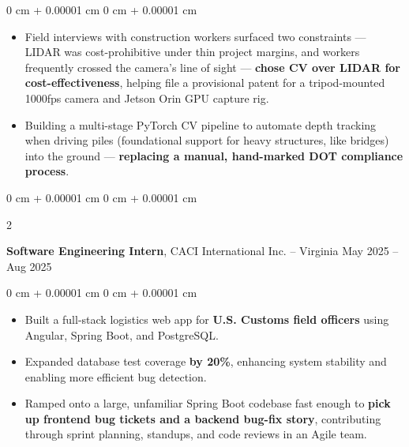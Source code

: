 \documentclass[10pt, letterpaper]{article}
\newenvironment{highlights}{
    \begin{itemize}[
        topsep=0.3 cm,
        parsep=0.075 cm,
        partopsep=0pt,
        itemsep=0.035 cm,
        leftmargin=0 cm + 10pt
    ]
}{
    \end{itemize}
} %
\newenvironment{onecolentry}{
    \begin{adjustwidth}{
        0 cm + 0.00001 cm
    }{
        0 cm + 0.00001 cm
    }
}{
    \end{adjustwidth}
} %
\newenvironment{twocolentry}[2][]{
    \onecolentry
    \def\secondColumn{#2}
    \setcolumnwidth{\fill, 4.5 cm}
    \begin{paracol}{2}
}{
    \switchcolumn \raggedleft \secondColumn
    \end{paracol}
    \endonecolentry
} %
\begin{document}
        \vspace{0.19 cm}
        \begin{onecolentry}
            \begin{highlights}
                \item Field interviews with construction workers surfaced two constraints — LIDAR was cost-prohibitive under thin project margins, and workers frequently crossed the camera's line of sight — \textbf{chose CV over LIDAR for cost-effectiveness}, helping file a provisional patent for a tripod-mounted 1000fps camera and Jetson Orin GPU capture rig.
                \item Building a multi-stage PyTorch CV pipeline to automate depth tracking when driving piles (foundational support for heavy structures, like bridges) into the ground — \textbf{replacing a manual, hand-marked DOT compliance process}.
            \end{highlights}
        \end{onecolentry}

        \vspace{0.19 cm}

        \begin{twocolentry}{
            May 2025 – Aug 2025
        }
            \textbf{Software Engineering Intern}, CACI International Inc. -- Virginia\end{twocolentry}

        \vspace{0.19 cm}
        \begin{onecolentry}
            \begin{highlights}
                \item Built a full-stack logistics web app for \textbf{U.S. Customs field officers} using Angular, Spring Boot, and PostgreSQL.
                \item Expanded database test coverage \textbf{by 20\%}, enhancing system stability and enabling more efficient bug detection.
                \item Ramped onto a large, unfamiliar Spring Boot codebase fast enough to \textbf{pick up frontend bug tickets and a backend bug-fix story}, contributing through sprint planning, standups, and code reviews in an Agile team.
            \end{highlights}
        \end{onecolentry}

        \vspace{0.19 cm}
\end{document}
